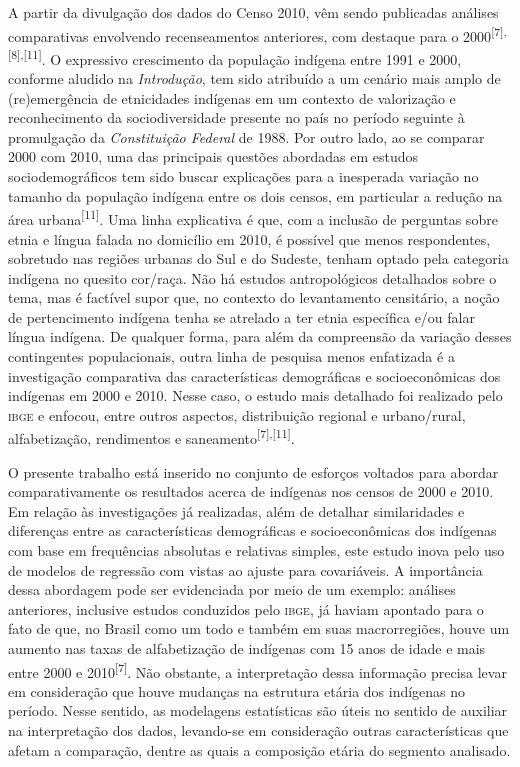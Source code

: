 \documentclass{article}
\begin{document}
A partir da divulgação dos dados do Censo 2010, vêm sendo publicadas análises
comparativas envolvendo recenseamentos anteriores, com destaque para o 2000\textsuperscript{[}\textsuperscript{7}\textsuperscript{]}\textsuperscript{,}\textsuperscript{[}\textsuperscript{8}\textsuperscript{]}\textsuperscript{,}\textsuperscript{[}\textsuperscript{11}\textsuperscript{]}. O expressivo crescimento da população indígena entre 1991 e 2000, conforme
aludido na \textit{Introdução}, tem sido atribuído a um cenário mais amplo de (re)emergência de etnicidades
indígenas em um contexto de valorização e reconhecimento da sociodiversidade
presente no país no período seguinte à promulgação da \textit{Constituição
Federal}
de 1988. Por outro lado, ao se comparar 2000 com 2010, uma das principais
questões abordadas em estudos sociodemográficos tem sido buscar explicações para
a inesperada variação no tamanho da população indígena entre os dois censos, em
particular a redução na área urbana\textsuperscript{[}\textsuperscript{11}\textsuperscript{]}. Uma linha explicativa é que, com a inclusão de perguntas sobre etnia e língua
falada no domicílio em 2010, é possível que menos respondentes, sobretudo nas
regiões urbanas do Sul e do Sudeste, tenham optado pela categoria indígena no
quesito cor/raça. Não há estudos antropológicos detalhados sobre o tema, mas é
factível supor que, no contexto do levantamento censitário, a noção de
pertencimento indígena tenha se atrelado a ter etnia específica e/ou falar
língua indígena. De qualquer forma, para além da compreensão da variação desses
contingentes populacionais, outra linha de pesquisa menos enfatizada é a
investigação comparativa das características demográficas e socioeconômicas dos
indígenas em 2000 e 2010. Nesse caso, o estudo mais detalhado foi realizado pelo
\textsc{ibge} e enfocou, entre outros aspectos, distribuição regional e urbano/rural,
alfabetização, rendimentos e saneamento\textsuperscript{[}\textsuperscript{7}\textsuperscript{]}\textsuperscript{,}\textsuperscript{[}\textsuperscript{11}\textsuperscript{]}.

O presente trabalho está inserido no conjunto de esforços voltados para abordar
comparativamente os resultados acerca de indígenas nos censos de 2000 e 2010. Em
relação às investigações já realizadas, além de detalhar similaridades e
diferenças entre as características demográficas e socioeconômicas dos indígenas
com base em frequências absolutas e relativas simples, este estudo inova pelo
uso de modelos de regressão com vistas ao ajuste para covariáveis. A importância
dessa abordagem pode ser evidenciada por meio de um exemplo: análises
anteriores, inclusive estudos conduzidos pelo \textsc{ibge}, já haviam apontado para o
fato de que, no Brasil como um todo e também em suas macrorregiões, houve um
aumento nas taxas de alfabetização de indígenas com 15 anos de idade e mais
entre 2000 e 2010\textsuperscript{[}\textsuperscript{7}\textsuperscript{]}. Não obstante, a interpretação dessa informação precisa levar em consideração
que houve mudanças na estrutura etária dos indígenas no período. Nesse sentido,
as modelagens estatísticas são úteis no sentido de auxiliar na interpretação dos
dados, levando-se em consideração outras características que afetam a
comparação, dentre as quais a composição etária do segmento analisado.
\end{document}
